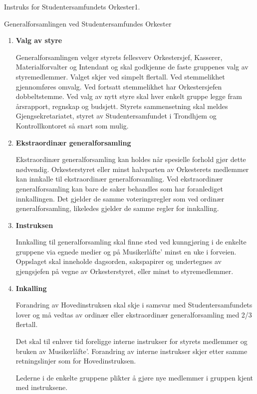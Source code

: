 \begin{instruks}{Instruks for Studentersamfundets Orkester}{1. }{ }
\begin{instruksledd}{Generalforsamlingen ved Studentersamfundes Orkester}
\begin{enumerate}
            \item \textbf{Valg av styre}

                Generalforsamlingen velger styrets fellesverv Orkestersjef, Kasserer, Materialforvalter og Intendant
                og skal
                godkjenne de faste gruppenes valg av styremedlemmer. Valget skjer ved simpelt flertall. Ved
                stemmelikhet
                gjennomføres omvalg. Ved fortsatt stemmelikhet har Orkestersjefen dobbeltstemme. Ved valg av nytt
                styre
                skal hver enkelt gruppe legge fram årsrapport, regnskap og budsjett. Styrets sammensetning skal
                meldes
                Gjengsekretariatet, styret av Studentersamfundet i Trondhjem og Kontrollkontoret så snart som mulig.

            \item \textbf{Ekstraordinær generalforsamling}

                Ekstraordinær generalforsamling kan holdes når spesielle forhold gjør dette nødvendig.
                Orkesterstyret eller
                minst halvparten av Orkesterets medlemmer kan innkalle til ekstraordinær generalforsamling. Ved
                ekstraordinær generalforsamling kan bare de saker behandles som har foranlediget innkallingen. Det
                gjelder
                de samme voteringsregler som ved ordinær generalforsamling, likeledes gjelder de samme regler for
                innkalling.

            \item \textbf{Instruksen}

                Innkalling til generalforsamling skal finne sted ved kunngjøring i de enkelte gruppene via
                egnede medier og
                på Musikerlåfte' minst en uke i forveien. Oppslaget skal inneholde dagsorden, sakspapirer og
                undertegnes av
                gjengsjefen på vegne av Orkesterstyret, eller minst to styremedlemmer.
            \item \textbf{Inkalling}

                Forandring av Hovedinstruksen skal skje i samsvar med Studentersamfundets lover og må vedtas av
                ordinær
                eller ekstraordinær generalforsamling med 2/3 flertall.

                Det skal til enhver tid foreligge interne instrukser for styrets medlemmer og bruken av
                Musikerlåfte'.
                Forandring av interne instrukser skjer etter samme retningslinjer som for Hovedinstruksen.

                Lederne i de enkelte gruppene plikter å gjøre nye medlemmer i gruppen kjent med instruksene.

        \end{enumerate}
    \end{instruksledd}

\end{instruks}


